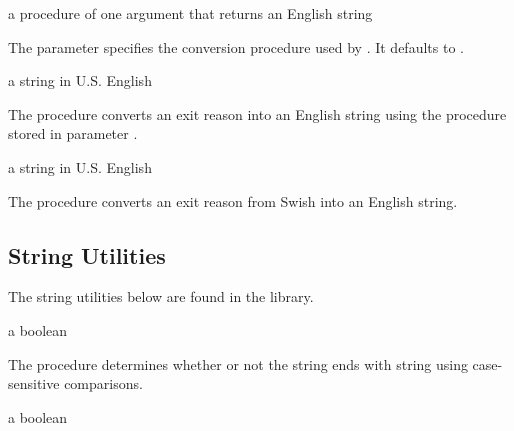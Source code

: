 \begin{parameter}
\end{parameter}
\hasvalue{} a procedure of one argument that returns an English string

The  parameter specifies the
conversion procedure used by . It defaults
to .

\begin{procedure}
\end{procedure}
\returns{} a string in U.S. English

The  procedure converts an exit reason into
an English string using the procedure stored in parameter
.

\begin{procedure}
\end{procedure}
\returns{} a string in U.S. English

The  procedure converts an exit
reason from Swish into an English string.

\subsection{String Utilities}

The string utilities below are found in the  library.

\begin{procedure}
\end{procedure}
\returns{} a boolean

The  procedure determines whether or not the string
 ends with string  using case-sensitive comparisons.

\begin{procedure}
\end{procedure}
\returns{} a boolean

